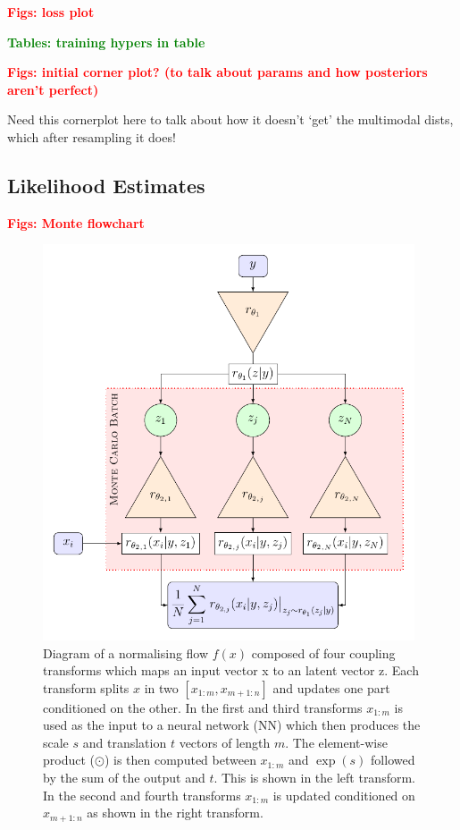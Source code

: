 \documentclass[aps,superscriptaddress,twocolumn,nopreprintnumbers,floatfix,groupedaddress]{revtex4-1}
\newcommand{\montefigwidth}{11cm}
\begin{document}
\textbf{\textcolor{red}{Figs: loss plot}}

\textbf{\textcolor{green}{Tables: training hypers in table}}

\textbf{\textcolor{red}{Figs: initial corner plot? (to talk about params and how posteriors aren't perfect)}}

Need this cornerplot here to talk about how it doesn't `get' the multimodal dists, which after resampling it does!

\subsection{Likelihood Estimates}

\textbf{\textcolor{red}{Figs: Monte flowchart}}

\begin{figure}
	\centering
	\includegraphics[width=\montefigwidth]{figs/tikz_monte.pdf}
	\caption{Diagram of a normalising flow $f(x)$ composed of four coupling transforms which maps an \protect{} input vector x to an \protect{} latent vector z. Each transform splits $x$ in two $[x_{1:m}, x_{m+1:n}]$ and updates one part conditioned on the other. In the first and third transforms $x_{1:m}$ is used as the input to a neural network (NN) which then produces the scale $s$ and translation $t$ vectors of length $m$. The element-wise product ($\odot$) is then computed between $x_{1:m}$ and $\exp(s)$ followed by the sum of the output and $t$. This is shown in the left transform. In the second and fourth transforms $x_{1:m}$ is updated conditioned on $x_{m+1:n}$ as shown in the right transform.}
	\label{fig:flow_diagram}
\end{figure}
\end{document}
